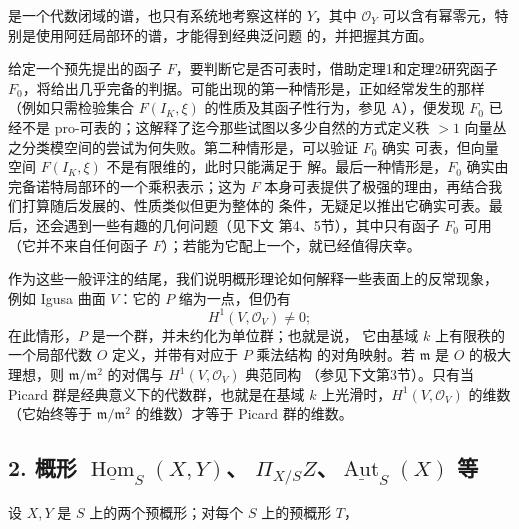 是一个代数闭域的谱，也只有系统地考察这样的 $Y$，其中
$\mathcal O_Y$ 可以含有幂零元，特别是使用阿廷局部环的谱，才能得到经典泛问题
的，并把握其方面。

给定一个预先提出的函子 $F$，要判断它是否可表时，借助定理1和定理2研究函子
$F_0$，将给出几乎完备的判据。可能出现的第一种情形是，正如经常发生的那样
（例如只需检验集合 $F(I_K,\xi)$ 的性质及其函子性行为，参见 A），便发现
$F_0$ 已经不是 pro-可表的；这解释了迄今那些试图以多少自然的方式定义秩
$>1$ 向量丛之分类模空间的尝试为何失败。第二种情形是，可以验证 $F_0$ 确实
可表，但向量空间 $F(I_K,\xi)$ 不是有限维的，此时只能满足于
解。最后一种情形是，$F_0$ 确实由完备诺特局部环的一个乘积表示；这为 $F$
本身可表提供了极强的理由，再结合我们打算随后发展的、性质类似但更为整体的
条件，无疑足以推出它确实可表。最后，还会遇到一些有趣的几何问题（见下文
第4、5节），其中只有函子 $F_0$ 可用（它并不来自任何函子
$F$）；若能为它配上一个，就已经值得庆幸。

作为这些一般评注的结尾，我们说明概形理论如何解释一些表面上的反常现象，
例如 Igusa 曲面 $V$：它的 $P$ 缩为一点，但仍有
\[
  H^1(V,\mathcal O_V)\ne 0 ;
\]
在此情形，$P$ 是一个群，并未约化为单位群；也就是说，
它由基域 $k$ 上有限秩的一个局部代数 $O$ 定义，并带有对应于 $P$ 乘法结构
的对角映射。若 $\mathfrak m$ 是 $O$ 的极大理想，则
$\mathfrak m/\mathfrak m^2$ 的对偶与 $H^1(V,\mathcal O_V)$ 典范同构
（参见下文第3节）。只有当 Picard 群是经典意义下的代数群，也就是在基域
$k$ 上光滑时，$H^1(V,\mathcal O_V)$ 的维数（它始终等于
$\mathfrak m/\mathfrak m^2$ 的维数）才等于 Picard 群的维数。

\subsection*{2. 概形 $\underline{\operatorname{Hom}}_S(X,Y)$、
$\Pi_{X/S}Z$、$\underline{\operatorname{Aut}}_S(X)$ 等}

设 $X,Y$ 是 $S$ 上的两个预概形；对每个 $S$ 上的预概形 $T$，

